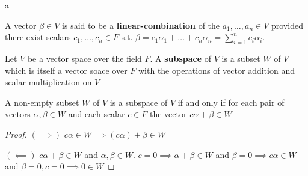 \documentclass[8pt]{beamer}
\newcommand{\tb}[1]{\textbf{#1}}
\begin{document}
\begin{frame}{a}
    \begin{definition}
        A vector $\beta \in V$ is said to be a \tb{linear-combination} of the $a_1, \dots, a_n \in V$ provided there exist scalars $c_1, \dots, c_n \in F$ s.t. 
        $\beta = c_1 \alpha_1 + \dots + c_n \alpha_n  = \sum_{i=1}^n c_i \alpha_i$.
    \end{definition}

    \begin{definition}
        Let $V$ be a vector space over the field $F$. A \tb{subspace} of $V$ is a subset $W$ of $V$ which is itself a vector soace over $F$ with the operations of vector addition and scalar multiplication on $V$ 
    \end{definition}

    \begin{theorem}
        A non-empty subset $W$ of $V$ is a subspace of $V$ if and only if for each pair of vectors $\alpha, \beta \in W$ and each scalar $c \in F$ the vector $c \alpha + \beta \in W$ 
    \end{theorem}
    \begin{proof}
        $(\implies)$ $c \alpha \in W \implies (c\alpha) + \beta \in W$

        $(\impliedby)$ $c \alpha  + \beta \in W$  and $\alpha, \beta \in W$. $c = 0 \implies \alpha + \beta \in W$ and $\beta = 0 \implies c \alpha \in W$  and $\beta =0 , c =0 \implies 0 \in W$
    \end{proof}
\end{frame}
\end{document}
